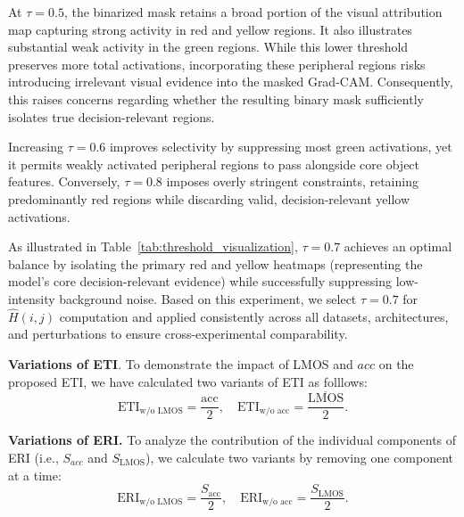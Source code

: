 \documentclass[a4paper,fleqn]{cas-dc}
\begin{document}
	At $\tau = 0.5$, the binarized mask retains a broad portion of the visual attribution map capturing strong activity in red and yellow regions. 
	It also illustrates substantial weak activity in the green regions. 
	While this lower threshold preserves more total activations, incorporating these peripheral regions risks introducing irrelevant visual evidence into the masked Grad-CAM. 
	Consequently, this raises concerns regarding whether the resulting binary mask sufficiently isolates true decision-relevant regions.
	
	Increasing $\tau = 0.6$ improves selectivity by suppressing most green activations, yet it permits weakly activated peripheral regions to pass alongside core object features. Conversely, $\tau = 0.8$ imposes overly stringent constraints, retaining predominantly red regions while discarding valid, decision-relevant yellow activations. 
	
	As illustrated in Table~\ref{tab:threshold_visualization}, $\tau = 0.7$ achieves an optimal balance by isolating the primary red and yellow heatmaps (representing the model's core decision-relevant evidence) while successfully suppressing low-intensity background noise. 
	Based on this experiment, we select $\tau = 0.7$ for $\hat H(i,j)$ computation and applied consistently across all datasets, architectures, and perturbations to ensure cross-experimental comparability.
	
	
	\noindent
	\textbf{Variations of ETI}. 
	To demonstrate the impact of LMOS and $acc$ on the proposed ETI, we have calculated two variants of ETI as folllows:
	$$\mathrm{ETI}_{\text{w/o LMOS}} = \frac{\text{acc}}{2}, \quad \mathrm{ETI}_{\text{w/o acc}} = \frac{\overline{\mathrm{LMOS}}}{2}.$$
	
	\noindent
	\textbf{Variations of ERI.}
	To analyze the contribution of the individual components of ERI (i.e., $S_{acc}$ and $S_{\mathrm{LMOS}}$), we calculate two variants by removing one component at a time:
	$$\mathrm{ERI}_{\text{w/o LMOS}} = \frac{S_{\text{acc}}}{2}, 
	\quad 
	\mathrm{ERI}_{\text{w/o acc}} = \frac{S_{\mathrm{LMOS}}}{2}.$$
	
\end{document}
